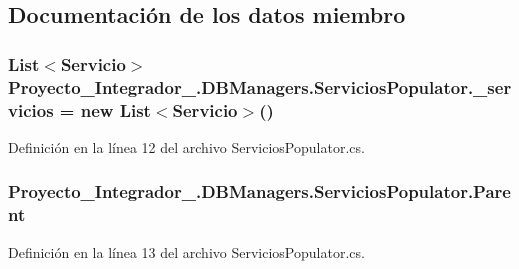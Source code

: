 \subsection{Documentación de los datos miembro}
\hypertarget{class_proyecto___integrador__3_1_1_d_b_managers_1_1_servicios_populator_af7501f1e6be90cfec6b9b974b6d8b911}{
\subsubsection[{\-\_\-servicios}]{\setlength{\rightskip}{0pt plus 5cm}List$<${\bf Servicio}$>$ Proyecto\-\_\-\-Integrador\-\_.\-D\-B\-Managers.\-Servicios\-Populator.\-\_\-servicios = new List$<${\bf Servicio}$>$()\hspace{0.3cm}{\ttfamily [private]}}}\label{class_proyecto___integrador__3_1_1_d_b_managers_1_1_servicios_populator_af7501f1e6be90cfec6b9b974b6d8b911}


Definición en la línea 12 del archivo Servicios\-Populator.\-cs.

\hypertarget{class_proyecto___integrador__3_1_1_d_b_managers_1_1_servicios_populator_a56aa6fea49cfd991726dc8c67e4e1742}{
\subsubsection[{Parent}]{ Proyecto\-\_\-\-Integrador\-\_.\-D\-B\-Managers.\-Servicios\-Populator.\-Parent\hspace{0.3cm}{\ttfamily [private]}}}\label{class_proyecto___integrador__3_1_1_d_b_managers_1_1_servicios_populator_a56aa6fea49cfd991726dc8c67e4e1742}


Definición en la línea 13 del archivo Servicios\-Populator.\-cs.



